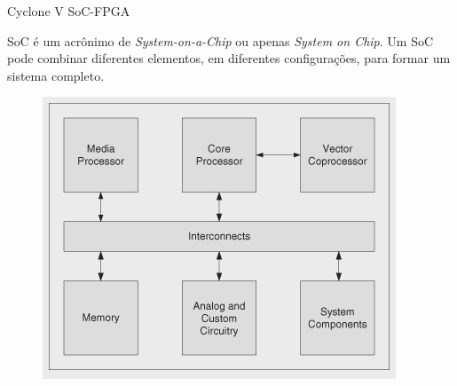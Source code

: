 \documentclass[10pt]{beamer}
\begin{document}
\begin{frame}{Cyclone V SoC-FPGA}
		\vspace{0.1cm}
		\begin{justify}
			SoC é um acrônimo de \textit{System-on-a-Chip} ou apenas \textit{System on Chip}. Um SoC pode combinar diferentes elementos, em diferentes configurações, para formar um sistema completo.
		\end{justify}
		
		\begin{figure}[h]
			\begin{center}
				\includegraphics[scale=0.395]{imagens/basicsoc.png}\\
			\end{center}
			\label{fig:SoC}
		\end{figure}
\end{frame}
\end{document}

